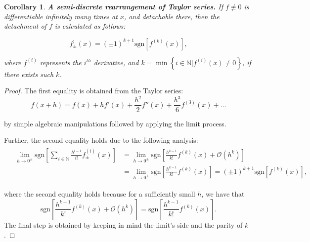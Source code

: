 \documentclass[11pt]{book}
\newtheorem{crl}[thm]{Corollary}
\begin{document}
\begin{crl}\label{taylor}\textbf{A semi-discrete rearrangement of Taylor series.} If $f\not\equiv0$ is differentiable infinitely many times at $x$, and detachable there, then the detachment of $f$ is calculated as follows:

$$f_{\pm}^{;}\left(x\right)=\left(\pm1\right)^{k+1}\text{sgn}\left[f^{\left(k\right)}\left(x\right)\right],$$

where $f^{\left(i\right)}$ represents the $i^{th}$ derivative, and $k=\min\left\{ i\in\mathbb{N}|f^{\left(i\right)}\left(x\right)\neq0\right\}$, if there exists such $k$.
\label{semi_discrete_taylor}
\end{crl}
\begin{proof}The first equality is obtained from the Taylor series: $$f(x+h)=f(x)+hf'(x)+\frac{h^{2}}{2}f''(x)+\frac{h^{3}}{6}f^{(3)}(x)+\ldots$$

by simple algebraic manipulations followed by applying the limit process.

Further, the second equality holds due to the following analysis:
\begin{align}
&\begin{aligned}
\underset{{\scriptscriptstyle h\rightarrow0^{\pm}}}{\lim}\text{sgn}\left[\underset{{\scriptscriptstyle i\in\mathbb{N}}}{\overset{}{\sum}}\frac{h^{i-1}}{i!}f_{\pm}^{\left(i\right)}\left(x\right)\right] &= \underset{{\scriptscriptstyle h\rightarrow0^{\pm}}}{\lim}\text{sgn}\left[\frac{h^{k-1}}{k!}f^{\left(k\right)}\left(x\right)+\mathcal{O}\left(h^{k}\right)\right] \\ 
&=\underset{{\scriptscriptstyle h\rightarrow0^{\pm}}}{\lim}\text{sgn}\left[\frac{h^{k-1}}{k!}f^{\left(k\right)}\left(x\right)\right]=\left(\pm1\right)^{k+1}\text{sgn}\left[f^{\left(k\right)}\left(x\right)\right],
\end{aligned}
\end{align}

where the second equality holds because for a sufficiently small $h$, we have that $$\text{sgn}\left[\frac{h^{k-1}}{k!}f^{\left(k\right)}\left(x\right)+\mathcal{O}\left(h^{k}\right)\right]=\text{sgn}\left[\frac{h^{k-1}}{k!}f^{\left(k\right)}\left(x\right)\right].$$
The final step is obtained by keeping in mind the limit’s side and the parity of $k$.
\end{proof}
\end{document}
